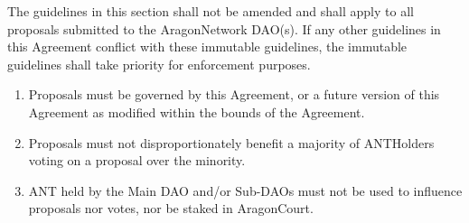 
\label{chap:ANDAOAgreement}

\begin{enumerate}
	\label{sec:ImmutableGuidelines}
	
	The guidelines in this section shall not be amended and shall apply to all proposals submitted to the \gls{AragonNetwork} \ac{DAO}(s). 
	If any other guidelines in this Agreement conflict with these immutable guidelines, the immutable guidelines shall take priority for enforcement purposes.
	\begin{enumerate}
		
		
		\begin{enumerate}
			\item Proposals must be governed by this Agreement, or a future version of this Agreement as modified within the bounds of the Agreement.
			\item Proposals must not disproportionately benefit a majority of \glspl{ANTHolder} voting on a proposal over the minority.
			\item \ac{ANT} held by the Main \ac{DAO} and/or Sub-\acp{DAO} must not be used to influence proposals nor votes, nor be staked in \gls{AragonCourt}.
		\end{enumerate}
	\end{enumerate}

	\label{sec:MutableGuidelines}
	

\end{enumerate}
